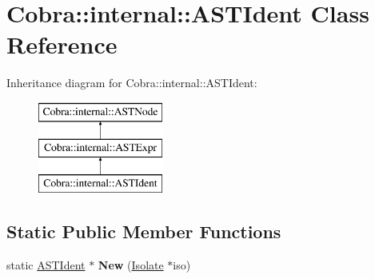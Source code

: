 \hypertarget{class_cobra_1_1internal_1_1_a_s_t_ident}{\section{Cobra\+:\+:internal\+:\+:A\+S\+T\+Ident Class Reference}
\label{class_cobra_1_1internal_1_1_a_s_t_ident}
}
Inheritance diagram for Cobra\+:\+:internal\+:\+:A\+S\+T\+Ident\+:\begin{figure}[H]
\begin{center}
\leavevmode
\includegraphics[height=3.000000cm]{class_cobra_1_1internal_1_1_a_s_t_ident}
\end{center}
\end{figure}
\subsection*{Static Public Member Functions}
\begin{DoxyCompactItemize}
\item 
\hypertarget{class_cobra_1_1internal_1_1_a_s_t_ident_a8ef1b5195e84dae892be0c4e81825ff3}{static \hyperlink{class_cobra_1_1internal_1_1_a_s_t_ident}{A\+S\+T\+Ident} $\ast$ {\bfseries New} (\hyperlink{class_cobra_1_1internal_1_1_isolate}{Isolate} $\ast$iso)}\label{class_cobra_1_1internal_1_1_a_s_t_ident_a8ef1b5195e84dae892be0c4e81825ff3}

\end{DoxyCompactItemize}

